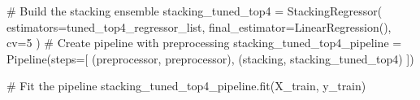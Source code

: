 \documentclass[
  letterpaper,
  DIV=11,
  numbers=noendperiod]{scrreprt}
\newenvironment{Shaded}{\begin{snugshade}}{\end{snugshade}}
\newcommand{\CommentTok}[1]{\textcolor[rgb]{0.37,0.37,0.37}{#1}}
\newcommand{\DecValTok}[1]{\textcolor[rgb]{0.68,0.00,0.00}{#1}}
\newcommand{\NormalTok}[1]{\textcolor[rgb]{0.00,0.23,0.31}{#1}}
\newcommand{\OperatorTok}[1]{\textcolor[rgb]{0.37,0.37,0.37}{#1}}
\newcommand{\StringTok}[1]{\textcolor[rgb]{0.13,0.47,0.30}{#1}}
\begin{document}
\begin{Shaded}
\begin{Highlighting}[]
\CommentTok{\# Build the stacking ensemble}
\NormalTok{stacking\_tuned\_top4 }\OperatorTok{=}\NormalTok{ StackingRegressor(}
\NormalTok{    estimators}\OperatorTok{=}\NormalTok{tuned\_top4\_regressor\_list,}
\NormalTok{    final\_estimator}\OperatorTok{=}\NormalTok{LinearRegression(),}
\NormalTok{    cv}\OperatorTok{=}\DecValTok{5}
\NormalTok{)}
\CommentTok{\# Create pipeline with preprocessing}
\NormalTok{stacking\_tuned\_top4\_pipeline }\OperatorTok{=}\NormalTok{ Pipeline(steps}\OperatorTok{=}\NormalTok{[}
\NormalTok{    (}\StringTok{\textquotesingle{}preprocessor\textquotesingle{}}\NormalTok{, preprocessor),}
\NormalTok{    (}\StringTok{\textquotesingle{}stacking\textquotesingle{}}\NormalTok{, stacking\_tuned\_top4)}
\NormalTok{])}

\CommentTok{\# Fit the pipeline}
\NormalTok{stacking\_tuned\_top4\_pipeline.fit(X\_train, y\_train)}
\end{Highlighting}
\end{Shaded}
\end{document}
